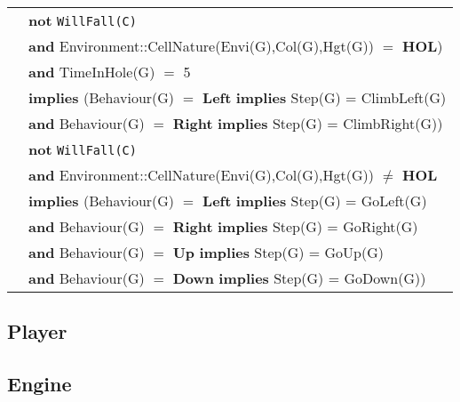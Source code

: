 \documentclass[8pt]{article}
\begin{document}
{\begin{longtable}{rl}
  & \textbf{not} \texttt{WillFall(C)} \\
  & \quad\quad \textbf{and} \textrm{Environment::CellNature(Envi(G),Col(G),Hgt(G))} $=$ \textbf{HOL}) \\
  & \quad\quad \textbf{and} \textrm{TimeInHole(G)} $=$ 5 \\
  & \quad\quad \textbf{implies} (\textrm{Behaviour(G)} $=$ \textbf{Left} \textbf{implies} \textrm{Step(G)} = \textrm{ClimbLeft(G)} \\
  & \quad\quad\quad\quad \textbf{and} \textrm{Behaviour(G)} $=$ \textbf{Right} \textbf{implies} \textrm{Step(G)} = \textrm{ClimbRight(G)}) \\
  & \textbf{not} \texttt{WillFall(C)} \\
  & \quad\quad \textbf{and} \textrm{Environment::CellNature(Envi(G),Col(G),Hgt(G))} $\neq$ \textbf{HOL} \\
  & \quad\quad \textbf{implies} (\textrm{Behaviour(G)} $=$ \textbf{Left} \textbf{implies} \textrm{Step(G)} = \textrm{GoLeft(G)} \\
  & \quad\quad\quad\quad \textbf{and} \textrm{Behaviour(G)} $=$ \textbf{Right} \textbf{implies} \textrm{Step(G)} = \textrm{GoRight(G)}\\
  & \quad\quad\quad\quad \textbf{and} \textrm{Behaviour(G)} $=$ \textbf{Up} \textbf{implies} \textrm{Step(G)} = \textrm{GoUp(G)}\\
  & \quad\quad\quad\quad \textbf{and} \textrm{Behaviour(G)} $=$ \textbf{Down} \textbf{implies} \textrm{Step(G)} = \textrm{GoDown(G)})\\
\end{longtable}}

\subsection{Player}

\subsection{Engine}
\end{document}
